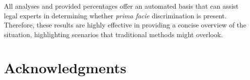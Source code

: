 \documentclass[letterpaper]{article} %
\begin{document}
All analyses and provided percentages offer an automated basis that can assist legal experts in determining whether \emph{prima facie} discrimination is present. Therefore, these results are highly effective in providing a concise overview of the situation, highlighting scenarios that traditional methods might overlook.


%
%


\section{Acknowledgments}

%

\end{document}

